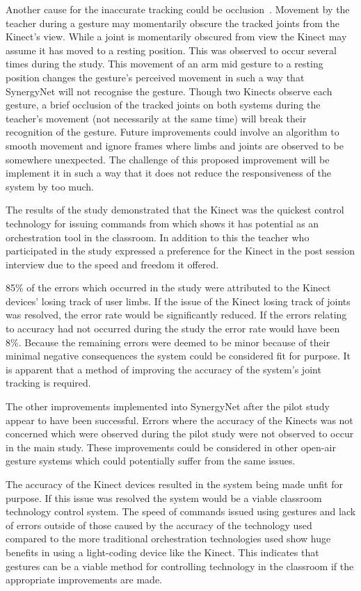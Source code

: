 \documentclass[link]{IWCOMP}
\begin{document}
Another cause for the inaccurate tracking could be occlusion~\citep{Meng2012}.
Movement by the teacher during a gesture may momentarily obscure the tracked joints from the Kinect's view.
While a joint is momentarily obscured from view the Kinect may assume it has moved to a resting position.
This was observed to occur several times during the study.
This movement of an arm mid gesture to a resting position changes the gesture's perceived movement in such a way that SynergyNet will not recognise the gesture.
Though two Kinects observe each gesture, a brief occlusion of the tracked joints on both systems during the teacher's movement (not necessarily at the same time) will break their recognition of the gesture.
Future improvements could involve an algorithm to smooth movement and ignore frames where limbs and joints are observed to be somewhere unexpected.
The challenge of this proposed improvement will be implement it in such a way that it does not reduce the responsiveness of the system by too much.

The results of the study demonstrated that the Kinect was the quickest control technology for issuing commands from which shows it has potential as an orchestration tool in the classroom.
In addition to this the teacher who participated in the study expressed a preference for the Kinect in the post session interview due to the speed and freedom it offered.

85\% of the errors which occurred in the study were attributed to the Kinect devices' losing track of user limbs.
If the issue of the Kinect losing track of joints was resolved, the error rate would be significantly reduced.
If the errors relating to accuracy had not occurred during the study the error rate would have been 8\%.
Because the remaining errors were deemed to be minor because of their minimal negative consequences the system could be considered fit for purpose.
It is apparent that a method of improving the accuracy of the system's joint tracking is required.

The other improvements implemented into SynergyNet after the pilot study appear to have been successful.
Errors where the accuracy of the Kinects was not concerned which were observed during the pilot study were not observed to occur in the main study.
These improvements could be considered in other open-air gesture systems which could potentially suffer from the same issues.

The accuracy of the Kinect devices resulted in the system being made unfit for purpose.
If this issue was resolved the system would be a viable classroom technology control system.
The speed of commands issued using gestures and lack of errors outside of those caused by the accuracy of the technology used compared to the more traditional orchestration technologies used show huge benefits in using a light-coding device like the Kinect.
This indicates that gestures can be a viable method for controlling technology in the classroom if the appropriate improvements are made.
\end{document}
